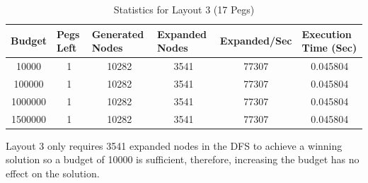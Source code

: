 \documentclass[12pt,a4paper]{article}
\begin{document}
\begin{table}[H]
\caption{Statistics for Layout 3 (17 Pegs)}
\label{tab:my-table}

\begin{tabular}{|c|c|c|c|c|c|}
\hline
Budget  & \multicolumn{1}{l|}{Pegs Left} & \multicolumn{1}{l|}{Generated Nodes} & \multicolumn{1}{l|}{Expanded Nodes} & \multicolumn{1}{l|}{Expanded/Sec} & \multicolumn{1}{l|}{Execution Time (Sec)} \\ \hline
10000   & 1                              & 10282                                & 3541                                & 77307                                & 0.045804                                              \\ \hline
100000  & 1                              & 10282                                & 3541                                & 77307                                & 0.045804                                              \\ \hline
1000000 & 1                              & 10282                                & 3541                                & 77307                                & 0.045804                                              \\ \hline
1500000 & 1                              & 10282                                & 3541                                & 77307                                & 0.045804                                              \\ \hline
\end{tabular}
\end{table}
Layout 3 only requires 3541 expanded nodes in the DFS to achieve a winning solution so a budget of 10000 is sufficient, therefore, increasing the budget has no effect on the solution.\\
\end{document}
